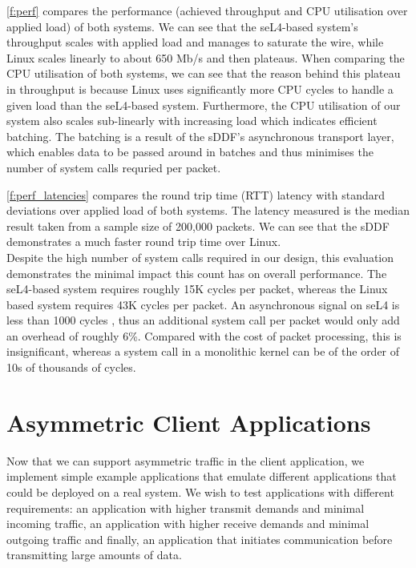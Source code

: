 \autoref{f:perf} compares the performance (achieved throughput and CPU utilisation over applied load) of both systems. 
We can see that the seL4-based system's throughput scales with applied load and manages to saturate the wire, while
Linux scales linearly to about 650 Mb/s and then plateaus. When comparing the CPU utilisation of both systems, we
can see that the reason behind this plateau in throughput is because Linux uses significantly more CPU cycles 
to handle a given load than the seL4-based system. Furthermore, the CPU utilisation of our system also scales 
sub-linearly with increasing load which indicates efficient batching. The batching is a result of the sDDF's asynchronous 
transport layer, which enables data to be passed around in batches and thus minimises the number of system calls requried per packet.

\autoref{f:perf_latencies} compares the round trip time (RTT) latency with standard deviations over applied load of both systems. The latency measured
is the median result taken from a sample size of 200,000 packets. We can see that the sDDF demonstrates a much faster round trip time over Linux.\\

Despite the high number of system calls required in our design, this evaluation demonstrates the minimal impact this count has on overall performance. 
The seL4-based system requires roughly 15K cycles per packet, whereas the Linux based system requires 43K cycles per packet. An asynchronous signal on seL4
is less than 1000 cycles \cite{seL4bench_23}, thus an additional system call per packet would only add an overhead of roughly 6\%. Compared with the cost
of packet processing, this is insignificant, whereas a system call in a monolithic kernel can be of the order of 10s of thousands of cycles. 

\section{Asymmetric Client Applications}

Now that we can support asymmetric traffic in the client application, we implement simple example applications that emulate different
applications that could be deployed on a real system. We wish to test applications with different requirements: 
an application with higher transmit demands and minimal incoming traffic, an application with higher receive demands and minimal outgoing traffic
and finally, an application that initiates communication before transmitting large amounts of data.

